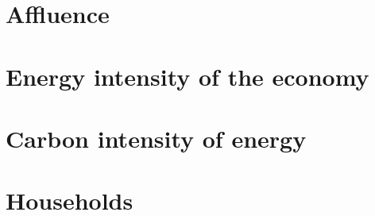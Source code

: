\documentclass{book}\usepackage[]{graphicx}\usepackage[]{color}
\begin{document}
\cleardoublepage
    

\chapter{Affluence}
\label{chap:affluence}





\cleardoublepage
    

\chapter{Energy intensity of the economy}
\label{chap:energy_intensity}





\cleardoublepage
    

\chapter{Carbon intensity of energy}
\label{chap:carbon_intensity}





\cleardoublepage
    

\chapter{Households}
\label{chap:households}
\end{document}
